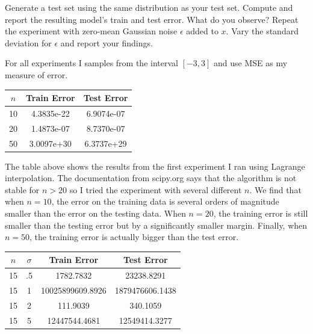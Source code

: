 \documentclass[a4paper]{article}
\theoremstyle{definition}
\newenvironment{soln}{
    \leavevmode\color{blue}\ignorespaces
}{}
\begin{document}
Generate a test set using the same distribution as your test set. Compute and report the resulting model’s train and test error. What do you observe?
Repeat the experiment with zero-mean Gaussian noise $\epsilon$ added to $x$. Vary the standard deviation for $\epsilon$ and report your findings.

\begin{soln}

  For all experiments I samples from the interval $[-3, 3]$ and use MSE as my measure of error.

  \begin{center}
    \begin{tabular}{|c|c|c|}
      \hline
      $n$ & Train Error & Test Error \\
      \hline
      10  &  4.3835e-22  &  6.9074e-07  \\
      20  &  1.4873e-07  &  8.7370e-07  \\
      50  &  3.0097e+30  &  6.3737e+29  \\
      \hline
    \end{tabular}
  \end{center}

  The table above shows the results from the first experiment I ran using Lagrange interpolation.
  The documentation from scipy.org says that the algorithm is not stable for $n > 20$ so I tried the experiment with several different $n$.
  We find that when $n=10$, the error on the training data is several orders of magnitude smaller than the error on the testing data.
  When $n=20$, the training error is still smaller than the testing error but by a significantly smaller margin.
  Finally, when $n=50$, the training error is actually bigger than the test error.

  \begin{center}
    \begin{tabular}{|c|c|c|c|}
      \hline
      $n$ & $\sigma$ & Train Error & Test Error \\
      \hline
      15  &  .5 & 1782.7832  &  23238.8291  \\
      15  &  1 & 10025899609.8926  &  1879476606.1438 \\
      15  &  2 & 111.9039  &  340.1059  \\
      15  &  5 & 12447544.4681  &  12549414.3277  \\
      \hline
    \end{tabular}
  \end{center}


\end{soln}
\end{document}

